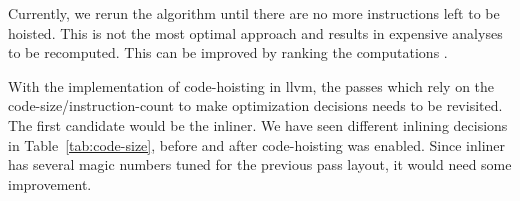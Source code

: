 \documentclass{sig-alternate}
\begin{document}
Currently, we rerun the algorithm until there are no more instructions left to
be hoisted. This is not the most optimal approach and results in expensive
analyses to be recomputed. This can be improved by ranking the computations
\cite{rosen1988global}.

With the implementation of code-hoisting in llvm, the passes which rely on the
code-size/instruction-count to make optimization decisions needs to be
revisited. The first candidate would be the inliner. We have seen different
inlining decisions in Table~\ref{tab:code-size}, before and after
code-hoisting was enabled.  Since inliner has several magic numbers tuned for
the previous pass layout, it would need some improvement.



{\small

}
\end{document}
